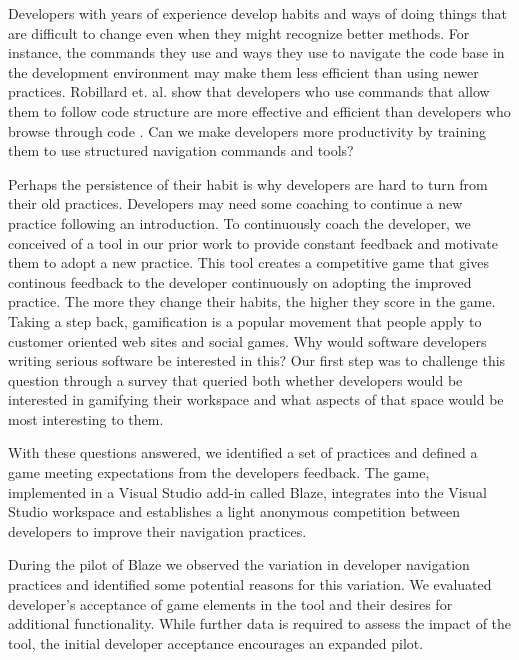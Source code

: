 \documentclass{sig-alternate}
\begin{document}

Developers with years of experience develop habits and ways of doing things that are difficult to change even when they might recognize better methods.   For instance, the commands they use and ways they use to navigate the code base in the development environment may make them less efficient than using newer practices. Robillard et. al. show that developers who use commands that allow them to follow code structure are more effective and efficient than developers who browse through code \cite{wbsnipes:Robillard2004How}.  Can we make developers more productivity by training them to use structured navigation commands and tools?  

Perhaps the persistence of their habit is why developers are hard to turn from their old practices.  Developers may need some coaching to continue a new practice following an introduction.  To continuously coach the developer, we conceived of a tool in our prior work to provide constant feedback and motivate them to adopt a new practice.  \cite{Snipes2013Towards} This tool creates a competitive game that gives continous feedback to the developer continuously on adopting the improved practice.  The more they change their habits, the higher they score in the game. 
Taking a step back, gamification is a popular movement that people apply to customer oriented web sites and social games.  Why would software developers writing serious software be interested in this?  Our first step was to challenge this question through a survey that queried both whether developers would be interested in gamifying their workspace and what aspects of that space would be most interesting to them.

With these questions answered, we identified a set of practices and defined a game meeting expectations from the developers feedback.  The game, implemented in a Visual Studio add-in called Blaze, integrates into the Visual Studio workspace and establishes a light anonymous competition between developers to improve their navigation practices. 

During the pilot of Blaze we observed the variation in developer navigation practices and identified some potential reasons for this variation.  We evaluated developer's acceptance of game elements in the tool and their desires for additional functionality.  While further data is required to assess the impact of the tool, the initial developer acceptance encourages an expanded pilot.
\end{document}
